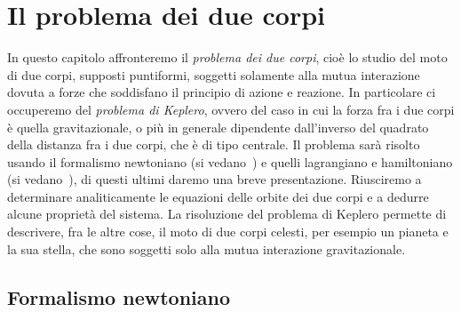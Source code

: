 \chapter{Il problema dei due corpi}
\label{chap:due-corpi}

In questo capitolo affronteremo il \emph{problema dei due corpi}, cioè lo studio
del moto di due corpi, supposti puntiformi, soggetti solamente alla mutua
interazione dovuta a forze che soddisfano il principio di azione e reazione. In
particolare ci occuperemo del \emph{problema di Keplero}, ovvero del caso in cui
la forza fra i due corpi è quella gravitazionale, o più in generale dipendente
dall'inverso del quadrato della distanza fra i due corpi, che è di tipo
centrale. Il problema sarà risolto usando il formalismo newtoniano (si
vedano~\cites{bradt:processes}{fabrizio:meccanica}{smart:textbook}) e quelli
lagrangiano e hamiltoniano (si
vedano~\cites{goldstein:meccanica}{landau:meccanica}), di questi ultimi daremo
una breve presentazione. Riusciremo a determinare analiticamente le equazioni
delle orbite dei due corpi e a dedurre alcune proprietà del sistema. La
risoluzione del problema di Keplero permette di descrivere, fra le altre cose,
il moto di due corpi celesti, per esempio un pianeta e la sua stella, che sono
soggetti solo alla mutua interazione gravitazionale.

\section{Formalismo newtoniano}
\label{sec:formalismo-newton}

